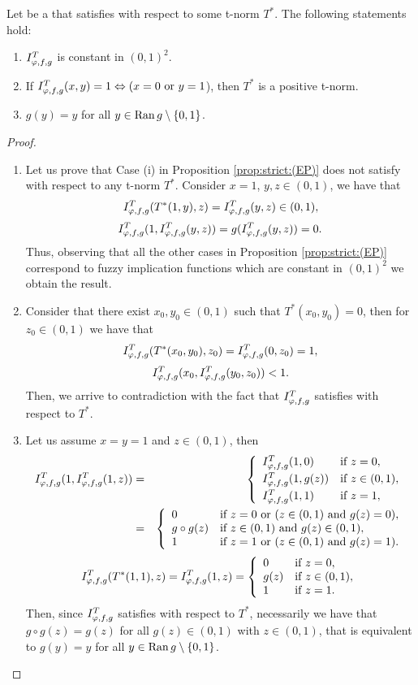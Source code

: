 \begin{lemma}\label{lem:strict:(LI)} Let \IT be a \STP that satisfies \LI with respect to some t-norm $T^*$. The following statements hold:
	\begin{enumerate}[label=(\roman*)]
		\item $I^T_{\varphi,f,g}$ is constant in $(0,1)^2$.
		\item If $I^T_{\varphi,f,g}(x,y)=1 \Leftrightarrow (x=0 \text{ or } y=1$), then $T^*$ is a positive t-norm.
		\item $g(y)=y$ for all $y \in \operatorname{Ran} g\setminus \{0,1\}$.
	\end{enumerate}
\end{lemma}
\begin{proof} \hspace{0.5cm}
	\begin{enumerate}[label=(\roman*)]
		\item Let us prove that Case (i) in Proposition \ref{prop:strict:(EP)} does not satisfy \LI with respect to any t-norm $T^*$. Consider $x=1$, $y,z \in (0,1)$, we have that
		$$I^T_{\varphi,f,g}(T^*(1,y),z)=I^T_{\varphi,f,g}(y,z)\in(0,1),$$
		$$I^T_{\varphi,f,g}(1,I^T_{\varphi,f,g}(y,z))=g(I^T_{\varphi,f,g}(y,z))=0.$$
		Thus, observing that all the other cases in Proposition \ref{prop:strict:(EP)} correspond to fuzzy implication functions which are constant in $(0,1)^2$ we obtain the result.
		\item Consider that there exist $x_0, y_0 \in (0,1)$ such that $T^*(x_0,y_0)=0$, then for $z_0 \in (0,1)$ we have that
		$$I^T_{\varphi,f,g}(T^*(x_0,y_0),z_0)=I^T_{\varphi,f,g}(0,z_0)=1,$$
		$$I^T_{\varphi,f,g}(x_0,I^T_{\varphi,f,g}(y_0,z_0))<1.$$
		Then, we arrive to contradiction with the fact that $I^T_{\varphi,f,g}$ satisfies \LI with respect to $T^*$.
		\item Let us assume $x=y=1$ and $z \in (0,1)$, then
		\begin{eqnarray*}
		I^T_{\varphi,f,g}(1,I^T_{\varphi,f,g}(1,z)) &=&
		\left\{ \begin{array}{ll}
			I^T_{\varphi,f,g}(1,0)&\text{if }z=0, \\[3pt]
			I^T_{\varphi,f,g}(1,g(z))&\text{if }z \in (0,1),\\[3pt]
			I^T_{\varphi,f,g}(1,1)&\text{if }z=1,
		\end{array}
		\right. \\
		&=&
		\left\{ \begin{array}{ll}
			0&\text{if }z=0 \text{ or } (z \in (0,1) \text{ and } g(z)=0), \\
			g \circ g(z)&\text{if }z \in (0,1) \text{ and } g(z) \in (0,1),\\
			1&\text{if }z=1 \text{ or } (z \in(0,1) \text{ and } g(z)=1).
		\end{array}
		\right.
		\end{eqnarray*}
		$$
		I^T_{\varphi,f,g}(T^*(1,1),z)
		=
		I^T_{\varphi,f,g}(1,z)
		=
		\left\{ \begin{array}{ll}
			0&\text{if }z=0, \\
			g(z)&\text{if }z \in (0,1),\\
			1&\text{if }z=1.
		\end{array}
		\right.
		$$
		Then, since $I^T_{\varphi,f,g}$ satisfies \LI with respect to $T^*$, necessarily we have that $g\circ g(z)=g(z)$ for all $g(z) \in (0,1)$ with $z \in (0,1)$, that is equivalent to $g(y)=y$ for all $y \in \operatorname{Ran} g \setminus \{0,1\}$.
	\end{enumerate}
\end{proof}
